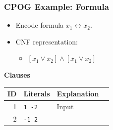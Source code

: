 \documentclass[t,pdf]{beamer}
\newcommand{\opos}[1]{#1}
\newcommand{\oneg}[1]{\overline{#1}}
\newcommand{\rtext}[1]{\textcolor{xred}{#1}}
\newcommand{\gtext}[1]{\textcolor{xgreen}{#1}}
\begin{document}
\begin{frame}
  \frametitle{CPOG Example: Formula}
\bigskip
\begin{minipage}{0.58\textwidth}
  \begin{itemize}
  \item Encode formula $x_1 \leftrightarrow x_2$.
  \item CNF representation:\\[.3em]
    \begin{itemize}
      \item[] $[\opos{x}_1 \lor \oneg{x}_2] \land [\oneg{x}_1 \lor \opos{x}_2]$
    \end{itemize}
  \end{itemize}
\end{minipage}
\begin{minipage}{0.4\textwidth}
{\bf Clauses}\\[0.5em]
\begin{tabular}{rlll}
\toprule
  ID & Literals & Explanation\\
\midrule
  \rtext{1} & \gtext{\texttt{1 -2}} & Input  \\
  \rtext{2} & \gtext{\texttt{-1 2}} &   \\
\bottomrule
\end{tabular}
\end{minipage}
\end{frame}
\end{document}
